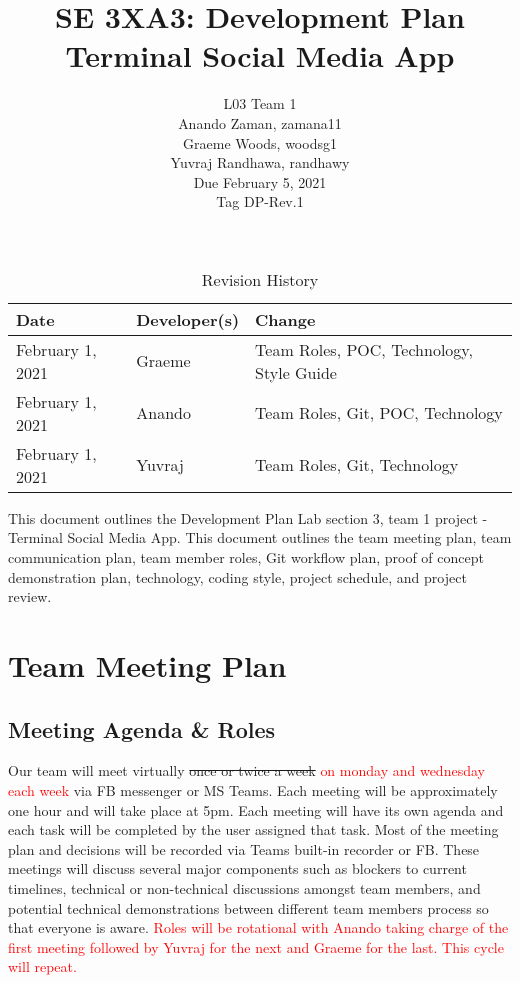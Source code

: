 \documentclass[12pt, titlepage]{article}
\title{SE 3XA3: Development Plan\\ Terminal Social Media App}
\author{L03 Team 1
		\\ Anando Zaman, zamana11
        \\ Graeme Woods, woodsg1
        \\ Yuvraj Randhawa, randhawy
        \\ Due February 5, 2021
        \\ Tag DP-Rev.1
}
\date{}
\begin{document}
\begin{table}[hp]
\caption{Revision History} \label{TblRevisionHistory}
\begin{tabularx}{\textwidth}{llX}
    \toprule
    \textbf{Date} & \textbf{Developer(s)} & \textbf{Change}\\
    \midrule
        February 1, 2021 & Graeme & Team Roles, POC, Technology, Style Guide \\
        February 1, 2021 & Anando & Team Roles, Git, POC, Technology \\
        February 1, 2021 & Yuvraj & Team Roles, Git, Technology \\
        \bottomrule
    \end{tabularx}
\end{table}

\newpage

\maketitle

\noindent This document outlines the Development Plan Lab section 3, team 1 project - Terminal Social Media App. This document outlines the team meeting plan, team communication plan, team member roles, Git workflow plan, proof of concept demonstration plan, technology, coding style, project schedule, and project review.

\section{Team Meeting Plan}


\subsection{{Meeting Agenda \& Roles}}
Our team will meet virtually \sout{once or twice a week} \textcolor{red}{on monday and wednesday each week} via FB messenger or MS Teams. Each meeting will be approximately one hour and will take place at 5pm. Each meeting will have its own agenda and each task will be completed by the user assigned that task. Most of the meeting plan and decisions will be recorded via Teams built-in recorder or FB. These meetings will discuss several major components such as blockers to current timelines, technical or non-technical discussions amongst team members, and potential technical demonstrations between different team members process so that everyone is aware. \textcolor{red}{Roles will be rotational with Anando taking charge of the first meeting followed by Yuvraj for the next and Graeme for the last. This cycle will repeat.}
\end{document}
